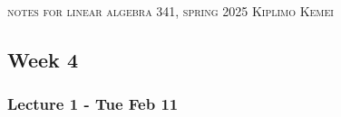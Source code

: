 \documentclass{article}
\begin{document}
\begin{center}
\textsc{notes for linear algebra 341, spring 2025}
\break
\textsc{Kiplimo Kemei}
\end{center}

\subsection*{Week 4}
\subsubsection*{Lecture 1 - Tue Feb 11}
\end{document}
